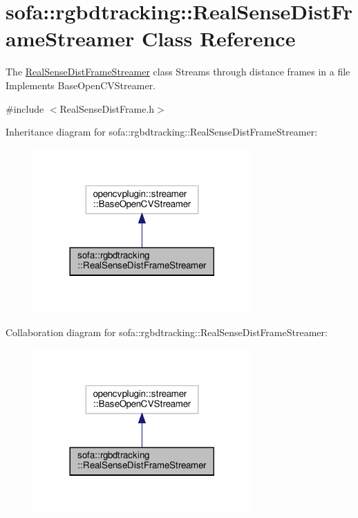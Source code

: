 \hypertarget{classsofa_1_1rgbdtracking_1_1_real_sense_dist_frame_streamer}{}\section{sofa\+:\+:rgbdtracking\+:\+:Real\+Sense\+Dist\+Frame\+Streamer Class Reference}
\label{classsofa_1_1rgbdtracking_1_1_real_sense_dist_frame_streamer}


The \hyperlink{classsofa_1_1rgbdtracking_1_1_real_sense_dist_frame_streamer}{Real\+Sense\+Dist\+Frame\+Streamer} class Streams through distance frames in a file Implements Base\+Open\+C\+V\+Streamer.  




{\ttfamily \#include $<$Real\+Sense\+Dist\+Frame.\+h$>$}



Inheritance diagram for sofa\+:\+:rgbdtracking\+:\+:Real\+Sense\+Dist\+Frame\+Streamer\+:
\nopagebreak
\begin{figure}[H]
\begin{center}
\leavevmode
\includegraphics[width=236pt]{classsofa_1_1rgbdtracking_1_1_real_sense_dist_frame_streamer__inherit__graph}
\end{center}
\end{figure}


Collaboration diagram for sofa\+:\+:rgbdtracking\+:\+:Real\+Sense\+Dist\+Frame\+Streamer\+:
\nopagebreak
\begin{figure}[H]
\begin{center}
\leavevmode
\includegraphics[width=236pt]{classsofa_1_1rgbdtracking_1_1_real_sense_dist_frame_streamer__coll__graph}
\end{center}
\end{figure}
